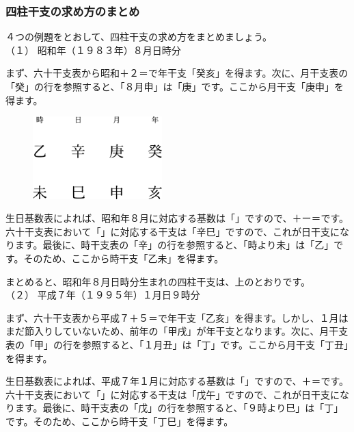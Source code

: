 \documentclass[a5paper,11pt,dvipdfmx]{tarticle}
\begin{document}
\subsubsection*{四柱干支の求め方のまとめ}
４つの例題をとおして、四柱干支の求め方をまとめましょう。\\

\noindent
（１） 昭和年（１９８３年）８月日時分

まず、六十干支表から昭和＋２＝で年干支「癸亥」を得ます。次に、月干支表の「癸」の行を参照すると、「８月申」は「庚」です。ここから月干支「庚申」を得ます。

\begin{figure}
  \includegraphics[width=50mm,angle=90]{figs/figure3-4.eps}
\end{figure}

生日基数表によれば、昭和年８月に対応する基数は「」ですので、＋ー＝です。六十干支表において「」に対応する干支は「辛巳」ですので、これが日干支になります。最後に、時干支表の「辛」の行を参照すると、「時より未」は「乙」です。そのため、ここから時干支「乙未」を得ます。

まとめると、昭和年８月日時分生まれの四柱干支は、上のとおりです。\\

\noindent
（２） 平成７年（１９９５年）１月日９時分

まず、六十干支表から平成７＋５＝で年干支「乙亥」を得ます。しかし、１月はまだ節入りしていないため、前年の「甲戌」が年干支となります。次に、月干支表の「甲」の行を参照すると、「１月丑」は「丁」です。ここから月干支「丁丑」を得ます。

生日基数表によれば、平成７年１月に対応する基数は「」ですので、＋＝です。六十干支表において「」に対応する干支は「戊午」ですので、これが日干支になります。最後に、時干支表の「戊」の行を参照すると、「９時より巳」は「丁」です。そのため、ここから時干支「丁巳」を得ます。
\end{document}
